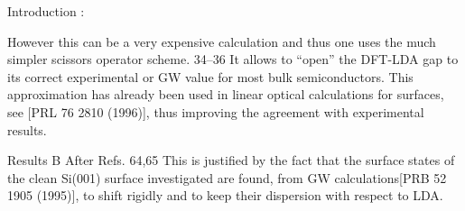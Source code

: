 Introduction : 

However this can be a very expensive calculation and thus one uses the much simpler scissors operator scheme. 34–36
It allows to “open” the DFT-LDA gap to its correct experimental or GW value for most bulk semiconductors. 
This approximation has already been used in linear optical calculations for surfaces, see [PRL 76 2810 (1996)], thus improving the agreement with experimental results. 

Results B After Refs. 64,65
This is justified by the fact that the surface states of the clean Si(001) surface investigated are found, 
from GW calculations[PRB 52 1905 (1995)], to shift rigidly and to keep their dispersion with respect to LDA.